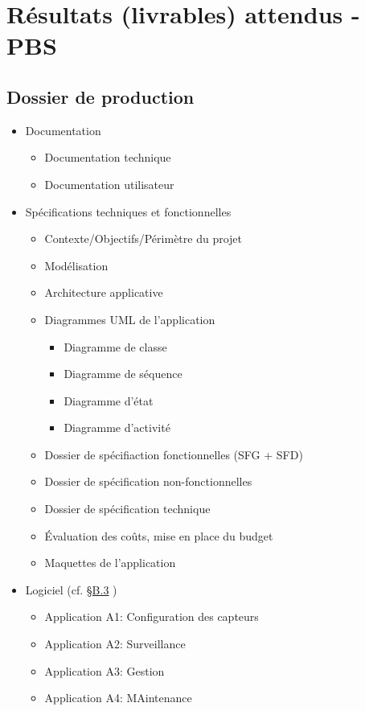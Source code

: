 \documentclass[a4paper]{article}
\begin{document}
	
	
	
	
	
	\section{Résultats (livrables) attendus - PBS}
                
	    \subsection{Dossier de production}
	        \begin{itemize}
	        \item Documentation \begin{itemize}
	                \item Documentation technique
	                \item Documentation utilisateur
	            \end{itemize}
	        \item Spécifications techniques et fonctionnelles
	            \begin{itemize}
	                \item Contexte/Objectifs/Périmètre du projet
	                \item Modélisation
	                \item Architecture applicative
	                \item Diagrammes UML de l'application
	                \begin{itemize}
	                    \item Diagramme de classe
	                    \item Diagramme de séquence
	                    \item Diagramme d'état
	                    \item Diagramme d'activité
	                \end{itemize}
	                \item Dossier de spécifiaction fonctionnelles (SFG + SFD)
	                \item Dossier de spécification non-fonctionnelles
	                \item Dossier de spécification technique
	                \item Évaluation des coûts, mise en place du budget
	                \item Maquettes de l'application
	        \end{itemize}
	        \item Logiciel (cf. \hyperlink{logiciel}{\S B.3} )
	            \begin{itemize}
	                \item Application A1: Configuration des capteurs
	                \item Application A2: Surveillance
	                \item Application A3: Gestion
	                \item Application A4: MAintenance
	            \end{itemize}
	        \end{itemize}
\end{document}
